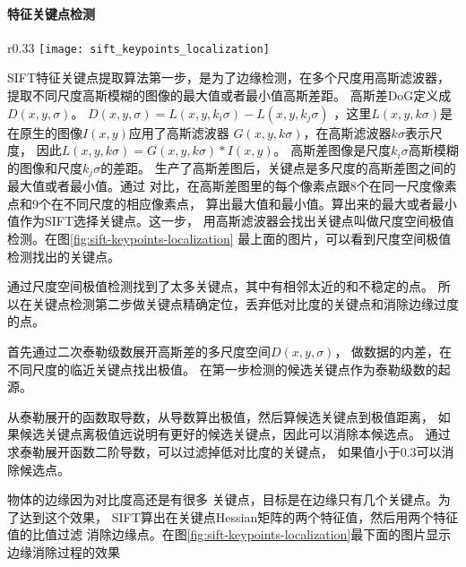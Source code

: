 \clearpage
\paragraph*{特征关键点检测}
\begin{wrapfigure}{r}{0.33\textwidth}
  \centering
    \texttt{[image: sift\_keypoints\_localization]}
    \caption{SIFT关键点检测过程。图片源：\cite{wiki:sift}}
  \label{fig:sift-keypoints-localization}
\end{wrapfigure}
SIFT特征关键点提取算法第一步，是为了边缘检测，在多个尺度用高斯滤波器，
提取不同尺度高斯模糊的图像的最大值或者最小值高斯差距。
高斯差DoG定义成$D \left( x, y, \sigma \right)$。
$D \left( x, y, \sigma \right) = L \left( x, y, k_i\sigma \right) - L \left( x, y, k_j\sigma \right)$
，这里$L \left( x, y, k\sigma \right)$是在原生的图像$I \left( x, y \right)$应用了高斯滤波器
$G \left( x, y, k\sigma \right)$，在高斯滤波器$k \sigma$表示尺度，
因此$L \left( x, y, k\sigma \right) = G \left( x, y, k\sigma \right) * I \left( x, y \right)$。
高斯差图像是尺度$k_i\sigma$高斯模糊的图像和尺度$k_j\sigma$的差距。
生产了高斯差图后，关键点是多尺度的高斯差图之间的最大值或者最小值。通过
对比，在高斯差图里的每个像素点跟8个在同一尺度像素点和9个在不同尺度的相应像素点，
算出最大值和最小值。算出来的最大或者最小值作为SIFT选择关键点。这一步，
用高斯滤波器会找出关键点叫做尺度空间极值检测。在图\ref{fig:sift-keypoints-localization}
最上面的图片，可以看到尺度空间极值检测找出的关键点。

通过尺度空间极值检测找到了太多关键点，其中有相邻太近的和不稳定的点。
所以在关键点检测第二步做关键点精确定位，丢弃低对比度的关键点和消除边缘过度的点。

首先通过二次泰勒级数展开高斯差的多尺度空间$D \left( x, y, \sigma \right)$，
做数据的内差，在不同尺度的临近关键点找出极值。
在第一步检测的候选关键点作为泰勒级数的起源。

从泰勒展开的函数取导数，从导数算出极值，然后算候选关键点到极值距离，
如果候选关键点离极值远说明有更好的候选关键点，因此可以消除本候选点。
通过求泰勒展开函数二阶导数，可以过滤掉低对比度的关键点，
如果值小于0.3可以消除候选点。

物体的边缘因为对比度高还是有很多
关键点，目标是在边缘只有几个关键点。为了达到这个效果，
SIFT算出在关键点Hessian矩阵的两个特征值，然后用两个特征值的比值过滤
消除边缘点。在图\ref{fig:sift-keypoints-localization}最下面的图片显示
边缘消除过程的效果

